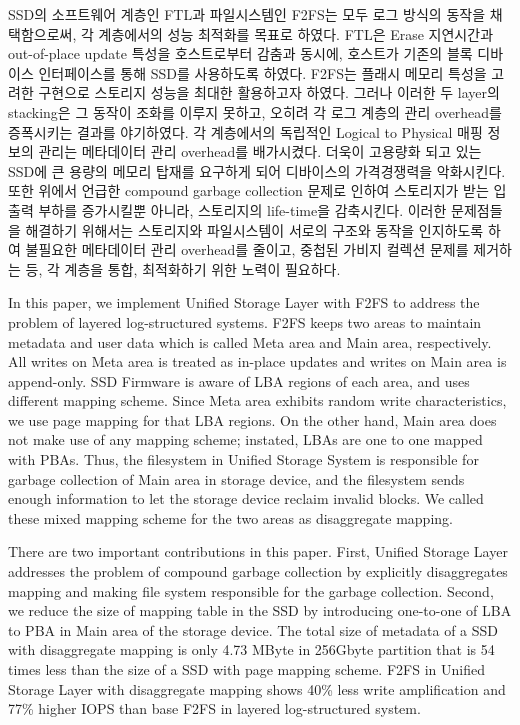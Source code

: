\documentclass[letterpaper,twocolumn,10pt]{article}
\begin{document}
SSD의 소프트웨어 계층인 FTL과 파일시스템인 F2FS는 모두 로그 방식의 동작을 채택함으로써, 각 계층에서의 성능 최적화를 목표로 하였다. FTL은 Erase 지연시간과 out-of-place update 특성을 호스트로부터 감춤과 동시에, 호스트가 기존의 블록 디바이스 인터페이스를 통해 SSD를 사용하도록 하였다. F2FS는 플래시 메모리 특성을 고려한 구현으로 스토리지 성능을 최대한 활용하고자 하였다. 그러나 이러한 두 layer의 stacking은 그 동작이 조화를 이루지 못하고, 오히려 각 로그 계층의 관리 overhead를 증폭시키는 결과를 야기하였다. 각 계층에서의 독립적인 Logical to Physical 매핑 정보의 관리는 메타데이터 관리 overhead를 배가시켰다. 더욱이 고용량화 되고 있는 SSD에 큰 용량의 메모리 탑재를 요구하게 되어 디바이스의 가격경쟁력을 악화시킨다. 또한 위에서 언급한 compound garbage collection 문제로 인하여 스토리지가 받는 입출력 부하를 증가시킬뿐 아니라, 스토리지의 life-time을 감축시킨다. 이러한 문제점들을 해결하기 위해서는 스토리지와 파일시스템이 서로의 구조와 동작을 인지하도록 하여 불필요한 메타데이터 관리 overhead를 줄이고, 중첩된 가비지 컬렉션 문제를 제거하는 등, 각 계층을 통합, 최적화하기 위한 노력이 필요하다.

In this paper, we implement Unified Storage Layer with F2FS\cite{lee2015f2fs} to address the problem of layered log-structured systems. F2FS keeps two areas to maintain metadata and user data which is called Meta area and Main area, respectively. All writes on Meta area is treated as in-place updates and writes on Main area is append-only. SSD Firmware is aware of LBA regions of each area, and uses different mapping scheme. Since Meta area exhibits random write characteristics, we use page mapping for that LBA regions. On the other hand, Main area does not make use of any mapping scheme; instated, LBAs are one to one mapped with PBAs. Thus, the filesystem in Unified Storage System is responsible for garbage collection of Main area in storage device, and the filesystem sends enough information to let the storage device reclaim invalid blocks. We called these mixed mapping scheme for the two areas as disaggregate mapping.

There are two important contributions in this paper. First, Unified Storage Layer addresses the problem of compound garbage collection by explicitly disaggregates mapping and making file system responsible for the garbage collection. Second, we reduce the size of mapping table in the SSD by introducing one-to-one of LBA to PBA in Main area of the storage device. The total size of metadata of a SSD with disaggregate mapping is only 4.73 MByte in 256Gbyte partition that is 54 times less than the size of a SSD with page mapping scheme. F2FS in Unified Storage Layer with disaggregate mapping shows 40\% less write amplification and 77\% higher IOPS than base F2FS in layered log-structured system.
\end{document}
